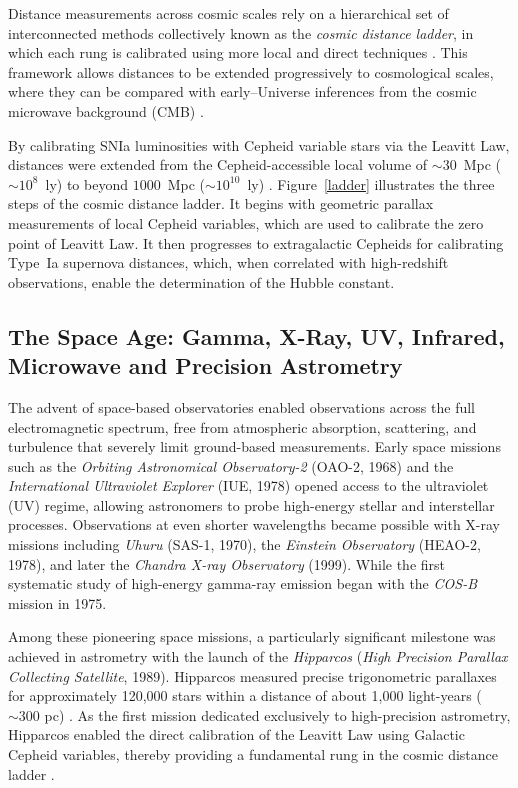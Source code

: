 

Distance measurements across cosmic scales rely on a hierarchical set of interconnected methods collectively known as the \emph{cosmic distance ladder}, in which each rung is calibrated using more local and direct techniques \citep{Hubble1929, Freedman2010}. This framework allows distances to be extended progressively to cosmological scales, where they can be compared with early–Universe inferences from the cosmic microwave background (CMB) \citep{2018planckVI}.


By calibrating SNIa luminosities with Cepheid variable stars via the Leavitt Law, distances were extended from the Cepheid-accessible local volume of $\sim 30$~Mpc ($\sim 10^8$~ly) to beyond $1000$~Mpc ($\sim 10^{10}$~ly) \citep{1998riess}. Figure~\ref{ladder} illustrates the three steps of the cosmic distance ladder. It begins with geometric parallax measurements of local Cepheid variables, which are used to calibrate the zero point of Leavitt Law. It then progresses to extragalactic Cepheids for calibrating Type~Ia supernova distances, which, when correlated with high-redshift observations, enable the determination of the Hubble constant. 

\subsection{The Space Age: Gamma, X-Ray, UV, Infrared, Microwave and Precision Astrometry}

The advent of space-based observatories enabled observations across the full electromagnetic spectrum, free from atmospheric absorption, scattering, and turbulence that severely limit ground-based measurements. Early space missions such as the \emph{Orbiting Astronomical Observatory-2} (OAO-2, 1968) and the \emph{International Ultraviolet Explorer} (IUE, 1978) opened access to the ultraviolet (UV) regime, allowing astronomers to probe high-energy stellar and interstellar processes. Observations at even shorter wavelengths became possible with X-ray missions including \emph{Uhuru} (SAS-1, 1970), the \emph{Einstein Observatory} (HEAO-2, 1978), and later the \emph{Chandra X-ray Observatory} (1999). While the first systematic study of high-energy gamma-ray emission began with the \emph{COS-B} mission in 1975.

Among these pioneering space missions, a particularly significant milestone was achieved in astrometry with the launch of the \emph{Hipparcos} (\emph{High Precision Parallax Collecting Satellite}, 1989). Hipparcos measured precise trigonometric parallaxes for approximately 120,000 stars within a distance of about 1,000 light-years ($\sim 300$ pc) \citep{1997esa}. As the first mission dedicated exclusively to high-precision astrometry, Hipparcos enabled the direct calibration of the Leavitt Law using Galactic Cepheid variables, thereby providing a fundamental rung in the cosmic distance ladder \citep{1997feats}.

